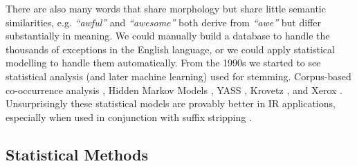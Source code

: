 There are also many words that share morphology but share little semantic similarities, e.g. \textit{``awful''} and \textit{``awesome''} both derive from \textit{``awe''} but differ substantially in meaning. We could manually build a database to handle the thousands of exceptions in the English language, or we could apply statistical modelling to handle them automatically. From the 1990s we started to see statistical analysis (and later machine learning) used for stemming. Corpus-based co-occurrence analysis \cite{xu1998corpus}, Hidden Markov Models \cite{toman2006influence}, YASS  \cite{majumder2007yass}, Krovetz \cite{krovetz2000viewing}, and Xerox \cite{grefenstette1996detailed}. Unsurprisingly these statistical models are provably better in IR applications, especially when used in conjunction with suffix stripping \cite{jivani2011comparative}.






\subsection{Statistical Methods}





